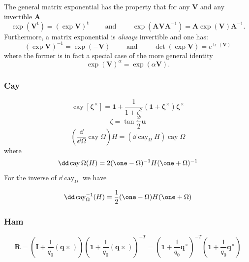 The general matrix exponential has the property that for any  \(\bm{V}\) and any invertible  \(\bm{A}\)   %
\begin{equation*} 
\operatorname{exp} \left(\bm{V}^{\mathrm{t}}\right)=(\operatorname{exp} \bm{V})^{\mathrm{t}}
\qquad\text{ and }\qquad
\operatorname{exp} \left(\bm{A} \bm{V} \bm{A}^{-1}\right) =\bm{A} \operatorname{exp} \left(\bm{V}\right) \bm{A}^{-1}.
\end{equation*}
  Furthermore, a matrix exponential is \emph{always} invertible and one
has: %
\begin{equation*} 
(\operatorname{exp} \bm{V})^{-1}=\operatorname{exp} \left(-\bm{V}\right)
\qquad\text{ and }\qquad
\operatorname{det}\left(\operatorname{exp}\bm{V}\right)=e^{\operatorname{tr}(\bm{V})}
\end{equation*}
where the former is in fact a special case of the more general
identity %
\begin{equation*} 
\exp \left(\bm{V}\right)^\alpha=\exp \left(\alpha \bm{V}\right).
\end{equation*}
 \fi

 \subsubsection{Cay}

 \begin{equation}
 \operatorname{cay}[\bm{\zeta}^{\times}] = 
\mathbf{1}+\frac{1}{1+\zeta^2}(\mathbf{1}+\bm{\zeta}^\times)\bm{\zeta}^\times
\end{equation}
$$
\zeta=\tan \frac{\varphi}{2} \mathbf{u}
$$
$$
\left(\frac{\dd}{\dd \Omega} \operatorname { cay } \Omega\right) H=\left(\dd \operatorname{cay}_{\Omega}H\right) \operatorname{cay} \Omega
$$
where
$$
\dd \operatorname { cay } \Omega(H)=2(\one-\Omega)^{-1} H(\one+\Omega)^{-1}
$$
For the inverse of  $\dd\operatorname{cay}_{\Omega}$ we have

$$
\dd \operatorname{cay}_{\Omega}^{-1}(H)=\frac{1}{2}(\one-\Omega) H(\one+\Omega)
$$

\subsubsection{Ham}

\begin{equation}
\bm{R}=\left(\mathbf{I}+\frac{1}{q_0}(\bm{q} \times)\right)\left(\mathbf{1}+\frac{1}{q_0}(\bm{q} \times)\right)^{-T}
=\left(\mathbf{1}+\frac{1}{q_0}\bm{q}^\times\right)^{-T}\left(\mathbf{1}+\frac{1}{q_0}\bm{q}^\times\right)
\end{equation}


